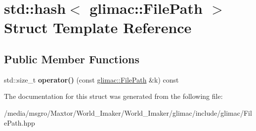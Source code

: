 \hypertarget{structstd_1_1hash_3_01glimac_1_1FilePath_01_4}{}\section{std\+:\+:hash$<$ glimac\+:\+:File\+Path $>$ Struct Template Reference}
\label{structstd_1_1hash_3_01glimac_1_1FilePath_01_4}
\subsection*{Public Member Functions}
\begin{DoxyCompactItemize}
\item 
\mbox{\label{structstd_1_1hash_3_01glimac_1_1FilePath_01_4_aef106b8bc300f85d943f47f631965d37}} 
std\+::size\+\_\+t {\bfseries operator()} (const \hyperlink{classglimac_1_1FilePath}{glimac\+::\+File\+Path} \&k) const
\end{DoxyCompactItemize}


The documentation for this struct was generated from the following file\+:\begin{DoxyCompactItemize}
\item 
/media/msgro/\+Maxtor/\+World\+\_\+\+Imaker/\+World\+\_\+\+Imaker/glimac/include/glimac/File\+Path.\+hpp\end{DoxyCompactItemize}

